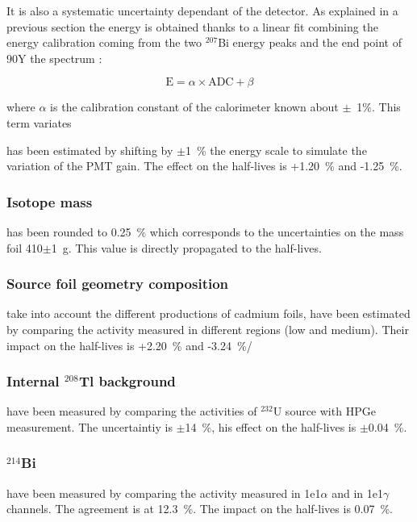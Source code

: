 \documentclass[main.tex]{subfiles}
\begin{document}
\NI It is also a systematic uncertainty dependant of the detector. As explained in a previous section the energy is obtained thanks to a linear fit combining the energy calibration coming from the two $^{\text{207}}$Bi energy peaks and the end point of ${\text{90}}$Y the spectrum :


\begin{equation}
\text{E} = \alpha \times \text{ADC} + \beta
\end{equation} 


\NI where $\alpha$ is the calibration constant of the calorimeter known about $\pm$~1\%. This term variates 

has been estimated by shifting by $\pm$1~\% the energy scale to simulate the variation of the PMT gain. The effect on the half-lives is +1.20~\% and -1.25~\%.   


\subsubsection{Isotope mass}


has been rounded to 0.25~\% which corresponds to the uncertainties on the mass foil 410$\pm$1~g. This value is directly propagated to the half-lives. 


\subsubsection{Source foil geometry composition}


take into account the different productions of cadmium foils, have been estimated by comparing the activity measured in different regions (low and medium). Their impact on the half-lives is +2.20~\% and -3.24~\%/


\subsubsection{Internal $^{\text{208}}$Tl background}


 have been measured by comparing the activities of $^{\text{232}}$U source with HPGe measurement. The uncertaintiy is $\pm$14~\%, his effect on the half-lives is $\pm$0.04~\%. 
 
 
\subsubsection{$^{\text{214}}$Bi}


have been measured by comparing the activity measured in 1e1$\alpha$ and in 1e1$\gamma$ channels. The agreement is at 12.3~\%. The impact on the half-lives is 0.07~\%.
\end{document}
